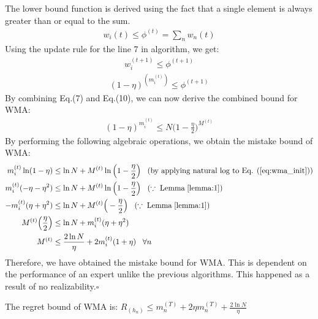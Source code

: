 \documentclass[11pt]{article}
\newcommand*{\QED}{\hfill\ensuremath{\square}}
\begin{document}
{The lower bound function is derived using the fact that a single element is always greater than or equal to the sum.
\begin{align}
    w_i{(t)} \leq \phi^{(t)}=\sum_n w_n{(t)} \label{eq:wma_lower}
\end{align}
Using the update rule for the line 7 in algorithm, we get:
\begin{align}
    w_i^{(t+1)} \leq \phi^{(t+1)}
\end{align}
\begin{align}
    (1-\eta)^{(m_i^{(t)})} \leq \phi^{(t+1)}
\end{align}
By combining Eq.(7) and Eq.(10), we can now derive the combined bound for WMA:
\begin{align}
    (1-\eta)^{m_i^{(t)}}\leq N\Big(1-\frac{\eta}{2}\Big)^{M^{(t)}} \label{eq:wma_init}
\end{align}
By performing the following algebraic operations, we obtain the mistake bound of WMA: \begin{align*}
    m_i^{(t)}\ln(1-\eta) &\leq \ln N + M^{(t)}\ln\Big(1-\frac{\eta}{2}\Big)\;\;\;(\text{by applying natural log to Eq. (\ref{eq:wma_init})})\\
    m_i^{(t)}(-\eta-\eta^2) &\leq \ln N + M^{(t)}\ln\Big(1-\frac{\eta}{2}\Big)\;\;\;(\because\; \text{Lemma}\;\ref{lemma:1})\\
    -m_i^{(t)}(\eta+\eta^2) &\leq \ln N + M^{(t)}\Big(-\frac{\eta}{2}\Big)\;\;\;(\because\; \text{Lemma}\;\ref{lemma:1})\\
    M^{(t)}\Big(\frac{\eta}{2}\Big)&\leq\ln N + m_i^{(t)}(\eta+\eta^2)\\
    M^{(t)}&\leq\frac{2\ln N}{\eta} +  2m_i^{(t)}(1+\eta)\;\;\;\forall n
\end{align*}
Therefore, we have obtained the mistake bound for WMA. This is dependent on the performance of an expert unlike the previous algorithms. This happened as a result of no realizability.\QED}



\theorem The regret bound of WMA is:
   $ R_(h_n) \leq m_n^{(T)} + 2\eta m_n^{(T)} + \frac{2\ln N}{\eta}$
\end{document}
